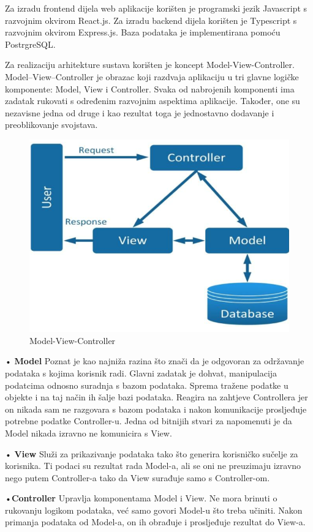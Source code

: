 {Za izradu frontend dijela web aplikacije korišten je programski jezik Javascript s razvojnim okvirom React.js. Za izradu backend dijela korišten je Typescript s razvojnim okvirom Express.js. Baza podataka je implementirana pomoću PostrgreSQL.

 Za realizaciju arhitekture sustava korišten je koncept Model-View-Controller. Model–View–Controller je obrazac koji razdvaja aplikaciju u tri glavne
logičke komponente: Model, View i Controller. Svaka od nabrojenih komponenti ima zadatak rukovati s određenim razvojnim aspektima aplikacije. Također, one
su nezavisne jedna od druge i kao rezultat toga je jednostavno dodavanje i preoblikovanje svojstava.

\begin{figure}[H]
					\centering
					\includegraphics[width=0.7\linewidth]{"slike/MVC"}
					\caption{Model-View-Controller}
					\label{fig:Model-View-Controller}
				\end{figure}

• \textbf{Model}
Poznat je kao najniža razina što znači da je odgovoran za održavanje podataka s kojima korisnik radi. Glavni zadatak je dohvat, manipulacija podatcima odnosno suradnja s bazom podataka. 
Sprema tražene podatke u objekte i na taj način ih šalje bazi podataka. Reagira na zahtjeve Controllera jer on nikada sam ne razgovara s bazom podataka i nakon komunikacije
prosljeđuje potrebne podatke Controller-u. Jedna od bitnijih stvari za napomenuti je da Model nikada izravno ne komunicira s View.

• \textbf{View}
Služi za prikazivanje podataka tako što generira korisničko sučelje za korisnika. Ti podaci su rezultat rada Model-a, ali se oni ne preuzimaju izravno nego putem Controller-a tako da View surađuje samo s Controller-om.

•\textbf{Controller} 
Upravlja komponentama Model i View. Ne mora
brinuti o rukovanju logikom podataka, već samo govori Model-u što treba učiniti. Nakon primanja podataka od Model-a, on ih obrađuje i prosljeđuje rezultat do View-a.}

